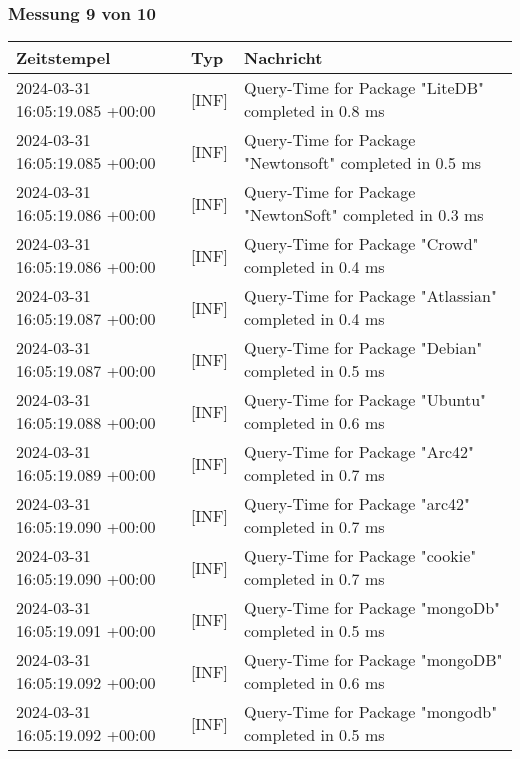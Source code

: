     \subsubsection{Messung 9 von 10} \label{subsubsec:MySQLMitIndex9von10}
        {
            {\small
                \begin{tabularx}{\textwidth}{|l|l|X|}
                    \hline
                    \textbf{Zeitstempel} & \textbf{Typ} & \textbf{Nachricht} \\
                    \hline
                    \endhead
                    2024-03-31 16:05:19.085 +00:00 & [INF] & Query-Time for Package "LiteDB" completed in 0.8 ms \\
                    2024-03-31 16:05:19.085 +00:00 & [INF] & Query-Time for Package "Newtonsoft" completed in 0.5 ms \\
                    2024-03-31 16:05:19.086 +00:00 & [INF] & Query-Time for Package "NewtonSoft" completed in 0.3 ms \\
                    2024-03-31 16:05:19.086 +00:00 & [INF] & Query-Time for Package "Crowd" completed in 0.4 ms \\
                    2024-03-31 16:05:19.087 +00:00 & [INF] & Query-Time for Package "Atlassian" completed in 0.4 ms \\
                    2024-03-31 16:05:19.087 +00:00 & [INF] & Query-Time for Package "Debian" completed in 0.5 ms \\
                    2024-03-31 16:05:19.088 +00:00 & [INF] & Query-Time for Package "Ubuntu" completed in 0.6 ms \\
                    2024-03-31 16:05:19.089 +00:00 & [INF] & Query-Time for Package "Arc42" completed in 0.7 ms \\
                    2024-03-31 16:05:19.090 +00:00 & [INF] & Query-Time for Package "arc42" completed in 0.7 ms \\
                    2024-03-31 16:05:19.090 +00:00 & [INF] & Query-Time for Package "cookie" completed in 0.7 ms \\
                    2024-03-31 16:05:19.091 +00:00 & [INF] & Query-Time for Package "mongoDb" completed in 0.5 ms \\
                    2024-03-31 16:05:19.092 +00:00 & [INF] & Query-Time for Package "mongoDB" completed in 0.6 ms \\
                    2024-03-31 16:05:19.092 +00:00 & [INF] & Query-Time for Package "mongodb" completed in 0.5 ms \\

\end{tabularx}}}
